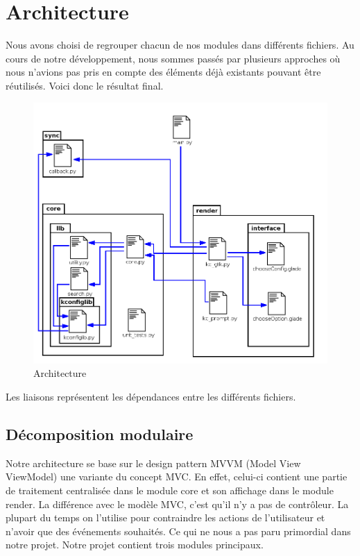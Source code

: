 ﻿\documentclass[16pts]{report}
\begin{document}

\nocite{*}

\chapter{Architecture}
\label{cha:Architecture}

Nous avons choisi de regrouper chacun de nos modules dans différents fichiers.
Au cours de notre développement, nous sommes passés par plusieurs approches
où nous n'avions pas pris en compte des éléments déjà existants pouvant être
réutilisés. Voici donc le résultat final.
\begin{figure}[H]
    \includegraphics[scale=0.5]{illustrations/archi_add_v1.png}
    \centering
    \caption{Architecture}
    \label{fig:Arch}
\end{figure}

Les liaisons représentent les dépendances entre les différents fichiers.

\section{Décomposition modulaire}
\label{sec:Décomposition modulaire}
Notre architecture se base sur le design pattern MVVM (Model View
ViewModel) une variante du concept MVC. En effet, celui-ci contient une
partie de traitement centralisée dans le module core et son affichage dans
le module render.
La différence avec le modèle MVC, c'est qu'il n'y a pas de contrôleur.  La
plupart du temps on l'utilise pour contraindre les actions de l'utilisateur
et n'avoir que des événements souhaités. Ce qui ne nous a pas paru primordial
dans notre projet.
Notre projet contient trois modules principaux.
\end{document}
